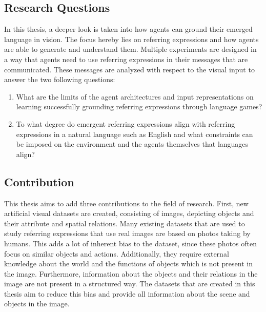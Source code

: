 \subsection{Research Questions}
In this thesis, a deeper look is taken into how agents can ground their emerged language in vision.
The focus hereby lies on referring expressions and how agents are able to generate and understand them.
Multiple experiments are designed in a way that agents need to use referring expressions in their messages that are communicated.
These messages are analyzed with respect to the visual input to answer the two following questions:
\begin{enumerate}
      \item What are the limits of the agent architectures and input representations on learning successfully grounding referring expressions through language games?
      \item To what degree do emergent referring expressions align with referring expressions in a natural language such as English and what constraints can be imposed on the environment and the agents themselves that languages align?
\end{enumerate}


\subsection{Contribution}
This thesis aims to add three contributions to the field of research.
First, new artificial visual datasets are created, consisting of images, depicting objects and their attribute and spatial relations.
Many existing datasets that are used to study referring expressions that use real images are based on photos taking by humans.
This adds a lot of inherent bias to the dataset, since these photos often focus on similar objects and actions.
Additionally, they require external knowledge about the world and the functions of objects which is not present in the image.
Furthermore, information about the objects and their relations in the image are not present in a structured way.
The datasets that are created in this thesis aim to reduce this bias and provide all information about the scene and objects in the image.


